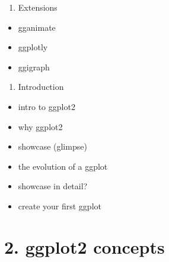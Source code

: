 \documentclass[
]{book}
\providecommand{\tightlist}{%
  \setlength{\itemsep}{0pt}\setlength{\parskip}{0pt}}
\begin{document}
\begin{enumerate}
\def\labelenumi{\arabic{enumi}.}
\setcounter{enumi}{3}
\tightlist
\item
  Extensions
\end{enumerate}

\begin{itemize}
\tightlist
\item
  gganimate
\item
  ggplotly
\item
  ggigraph
\end{itemize}

\begin{enumerate}
\def\labelenumi{\arabic{enumi}.}
\tightlist
\item
  Introduction
\end{enumerate}

\begin{itemize}
\tightlist
\item
  intro to ggplot2
\item
  why ggplot2
\item
  showcase (glimpse)
\item
  the evolution of a ggplot
\item
  showcase in detail?
\item
  create your first ggplot
\end{itemize}

\hypertarget{ggplot2-concepts}{%
\section{2. ggplot2 concepts}\label{ggplot2-concepts}}
\end{document}

